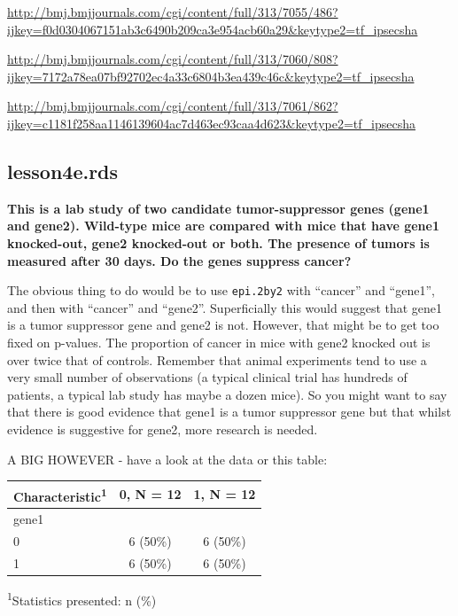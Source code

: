 \documentclass[]{book}
\newenvironment{Shaded}{\begin{snugshade}}{\end{snugshade}}
\newcommand{\DataTypeTok}[1]{\textcolor[rgb]{0.13,0.29,0.53}{#1}}
\newcommand{\KeywordTok}[1]{\textcolor[rgb]{0.13,0.29,0.53}{\textbf{#1}}}
\newcommand{\NormalTok}[1]{#1}
\newcommand{\OperatorTok}[1]{\textcolor[rgb]{0.81,0.36,0.00}{\textbf{#1}}}
\newcommand{\StringTok}[1]{\textcolor[rgb]{0.31,0.60,0.02}{#1}}
\begin{document}
\url{http://bmj.bmjjournals.com/cgi/content/full/313/7055/486?ijkey=f0d0304067151ab3c6490b209ca3e954acb60a29\&keytype2=tf_ipsecsha}

\url{http://bmj.bmjjournals.com/cgi/content/full/313/7060/808?ijkey=7172a78ea07bf92702ec4a33c6804b3ea439c46c\&keytype2=tf_ipsecsha}

\url{http://bmj.bmjjournals.com/cgi/content/full/313/7061/862?ijkey=c1181f258aa1146139604ac7d463ec93caa4d623\&keytype2=tf_ipsecsha}

\hypertarget{lesson4e.rds}{%
\subsection{lesson4e.rds}\label{lesson4e.rds}}

\textbf{This is a lab study of two candidate tumor-suppressor genes
(gene1 and gene2). Wild-type mice are compared with mice that have gene1
knocked-out, gene2 knocked-out or both. The presence of tumors is
measured after 30 days. Do the genes suppress cancer?}

The obvious thing to do would be to use \texttt{epi.2by2} with
``cancer'' and ``gene1'', and then with ``cancer'' and ``gene2''.
Superficially this would suggest that gene1 is a tumor suppressor gene
and gene2 is not. However, that might be to get too fixed on p-values.
The proportion of cancer in mice with gene2 knocked out is over twice
that of controls. Remember that animal experiments tend to use a very
small number of observations (a typical clinical trial has hundreds of
patients, a typical lab study has maybe a dozen mice). So you might want
to say that there is good evidence that gene1 is a tumor suppressor gene
but that whilst evidence is suggestive for gene2, more research is
needed.

A BIG HOWEVER - have a look at the data or this table:

\begin{Shaded}
\end{Shaded}

\captionsetup[table]{labelformat=empty,skip=1pt}
\begin{longtable}{lcc}
\toprule
\textbf{Characteristic}\textsuperscript{1} & \textbf{0}, N = 12 & \textbf{1}, N = 12 \\ 
\midrule
gene1 &  &  \\ 
0 & 6 (50\%) & 6 (50\%) \\ 
1 & 6 (50\%) & 6 (50\%) \\ 
\bottomrule
\end{longtable}
\vspace{-5mm}
\begin{minipage}{\linewidth}
\textsuperscript{1}Statistics presented: n (\%) \\ 
\end{minipage}
\end{document}
